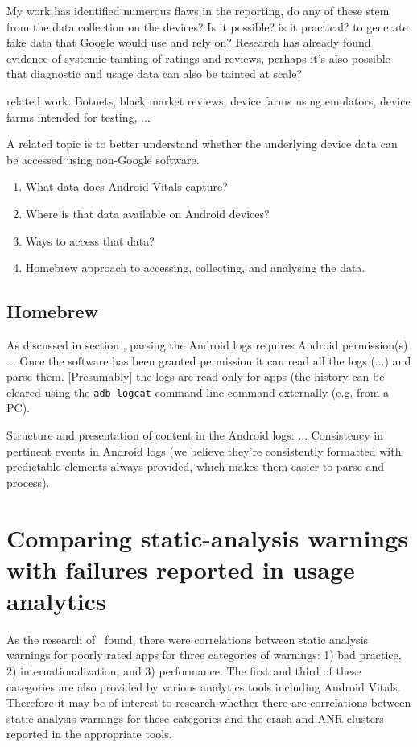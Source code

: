 My work has identified numerous flaws in the reporting, do any of these stem from the data collection on the devices? Is it possible? is it practical? to generate fake data that Google would use and rely on? Research has already found evidence of systemic tainting of ratings and reviews, perhaps it's also possible that diagnostic and usage data can also be tainted at scale?

related work: Botnets, black market reviews, device farms using emulators, device farms intended for testing, ...

A related topic is to better understand whether the underlying device data can be accessed using non-Google software. 

\begin{enumerate}
    \item What data does Android Vitals capture?
    \item Where is that data available on Android devices?
    \item Ways to access that data?
    \item Homebrew approach to accessing, collecting, and analysing the data.
\end{enumerate}

\subsection{Homebrew}
As discussed in section \href{platform-level-analytics}{\emph{}}, parsing the Android logs requires Android permission(s) ... Once the software has been granted permission it can read all the logs (...) and parse them. [Presumably] the logs are read-only for apps (the history can be cleared using the \texttt{adb logcat} command-line command externally (e.g. from a PC).

Structure and presentation of content in the Android logs: ...
Consistency in pertinent events in Android logs (we believe they're consistently formatted with predictable elements always provided, which makes them easier to parse and process).

\section{Comparing static-analysis warnings with failures reported in usage analytics}
As the research of~\cite{khalid2016_examining_the_relationship_between_findbugs_warnings_and_app_ratings} found, there were correlations between static analysis warnings for poorly rated apps for three categories of warnings: 1) bad practice, 2) internationalization, and 3) performance. The first and third of these categories are also provided by various analytics tools including Android Vitals. Therefore it may be of interest to research whether there are correlations between static-analysis warnings for these categories and the crash and ANR clusters reported in the appropriate tools. 

